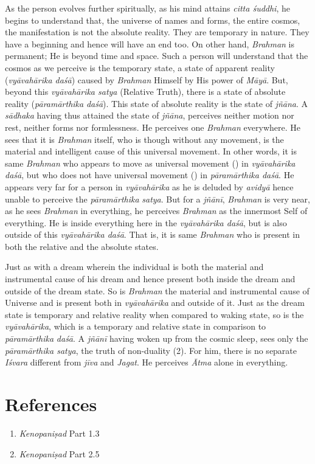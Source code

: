 As the person evolves further spiritually, as his mind attains \emph{citta śuddhi}, he begins to understand that, the universe of names and forms, the entire cosmos, the manifestation is not the absolute reality. They are temporary in nature. They have a beginning and hence will have an end too. On other hand, \emph{Brahman} is permanent; He is beyond time and space. Such a person will understand that the cosmos as we perceive is the temporary state, a state of apparent reality (\emph{vyāvahārika daśā}) caused by \emph{Brahman} Himself by His power of \emph{Māyā}. But, beyond this \emph{vyāvahārika satya} (Relative Truth), there is a state of absolute reality (\emph{pāramārthika} \emph{daśā}). This state of absolute reality is the state of \emph{jñāna}. A \emph{sādhaka} having thus attained the state of \emph{jñāna}, perceives neither motion nor rest, neither forms nor formlessness. He perceives one \emph{Brahman} everywhere. He sees that it is \emph{Brahman} itself, who is though without any movement, is the material and intelligent cause of this universal movement. In other words, it is same \emph{Brahman} who appears to move as universal movement () in \emph{vyāvahārika daśā}, but who does not have universal movement () in \emph{pāramārthika daśā}. He appears very far for a person in \emph{vyāvahārika} as he is deluded by \emph{avidyā} hence unable to perceive the \emph{pāramārthika} \emph{satya}. But for a \emph{jñānī}, \emph{Brahman} is very near, as he sees \emph{Brahman} in everything, he perceives \emph{Brahman} as the innermost Self of everything. He is inside everything here in the \emph{vyāvahārika daśā}, but is also outside of this \emph{vyāvahārika daśā}. That is, it is same \emph{Brahman} who is present in both the relative and the absolute states.

Just as with a dream wherein the individual is both the material and instrumental cause of his dream and hence present both inside the dream and outside of the dream state. So is \emph{Brahman} the material and instrumental cause of Universe and is present both in \emph{vyāvahārika} and outside of it. Just as the dream state is temporary and relative reality when compared to waking state, so is the \emph{vyāvahārika}, which is a temporary and relative state in comparison to \emph{pāramārthika} \emph{daśā}. A \emph{jñānī} having woken up from the cosmic sleep, sees only the \emph{pāramārthika satya}, the truth of non-duality (2). For him, there is no separate \emph{Iśvara} different from \emph{jīva} and \emph{Jagat}. He perceives \emph{Ātma} alone in everything.

\section*{References}

\begin{enumerate}
\item
  \emph{Kenopaniṣad} Part 1.3
\item
  \emph{Kenopaniṣad} Part 2.5
\end{enumerate}

